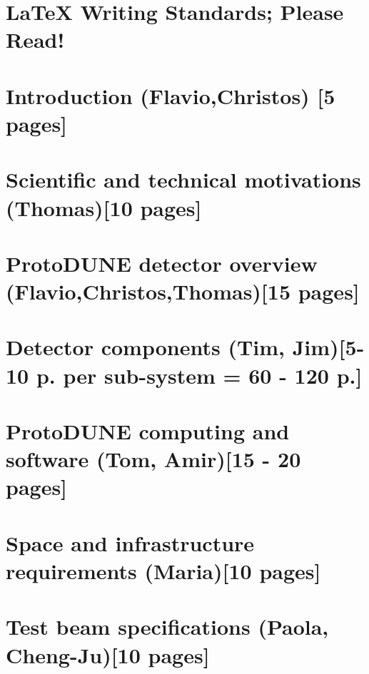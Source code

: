 \ifdefined\isfinal\documentclass[final]{pd-tdr}\else\documentclass{pd-tdr}\fi
\begin{document}







\chapter{LaTeX Writing Standards; Please Read!}


\chapter{Introduction {\color{red} (Flavio,Christos) [5 pages]}}


\chapter{Scientific and technical motivations {\color{red} (Thomas)[10 pages]}}


\chapter{ProtoDUNE detector overview {\color{red} (Flavio,Christos,Thomas)[15 pages]}}


\chapter{Detector components {\color{red} (Tim, Jim)[5-10 p. per sub-system = 60 - 120 p.]}}


\chapter{ProtoDUNE computing and software {\color{red} (Tom, Amir)[15 - 20 pages]}}


\chapter{Space and infrastructure requirements {\color{red} (Maria)[10 pages]}}


\chapter{Test beam specifications {\color{red} (Paola, Cheng-Ju)[10 pages]}} 

\end{document}
